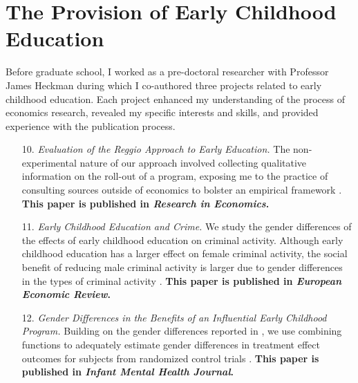 \section{The Provision of Early Childhood Education}

Before graduate school, I worked as a pre-doctoral researcher with Professor James Heckman during which I co-authored three projects related to early childhood education. Each project enhanced my understanding of the process of economics research, revealed my specific interests and skills, and provided experience with the publication process. 

\begin{enumerate}

    \item[10.] \textit{Evaluation of the Reggio Approach to Early Education.} The non-experimental nature of our approach involved collecting qualitative information on the roll-out of a program, exposing me to the practice of consulting sources outside of economics to bolster an empirical framework \citep{biroli_evaluation_2018}. \textbf{This paper is published in \textit{Research in Economics}.}

    \item[11.] \textit{Early Childhood Education and Crime.} We study the gender differences of the effects of early childhood education on criminal activity. Although early childhood education has a larger effect on female criminal activity, the social benefit of reducing male criminal activity is larger due to gender differences in the types of criminal activity \citep{garcia_gender_2018}. \textbf{This paper is published in \textit{European Economic Review}.}

    \item[12.] \textit{Gender Differences in the Benefits of an Influential Early Childhood Program.} Building on the gender differences reported in \citet{garcia_gender_2018}, we use combining functions to adequately estimate gender differences in treatment effect outcomes for subjects from randomized control trials \citep{garcia_early_2019}. \textbf{This paper is published in \textit{Infant Mental Health Journal}.}

\end{enumerate}

\singlespacing





